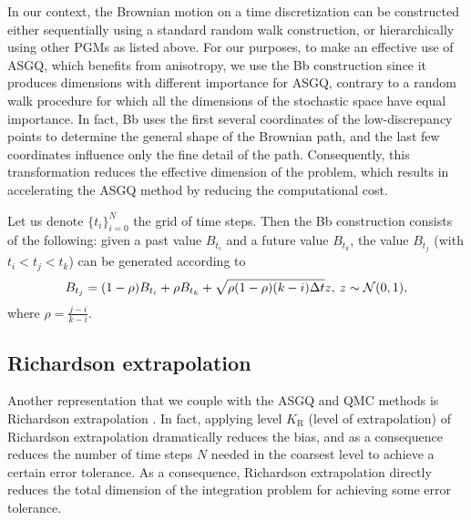 In our context, the Brownian motion on a time discretization  can be constructed either sequentially using a standard random walk construction, or hierarchically using   other PGMs as listed above. For our purposes, to make an effective use of ASGQ, which benefits from anisotropy, we use the Bb construction since it produces  dimensions with different importance for ASGQ, contrary to a random walk procedure for which all the dimensions of the stochastic space have equal importance. In fact, Bb uses the first several coordinates of the low-discrepancy points to determine the general shape of the Brownian path, and the last few coordinates influence only the fine detail of the path. Consequently, this transformation  reduces the effective dimension  of the problem, which results in accelerating the ASGQ method by reducing the computational cost.

Let us denote $\{t_i\}_{i=0}^{N}$ the grid of time steps. Then the Bb construction \cite{glasserman2004monte} consists of the following: given a past value $B_{t_i}$ and a future value $B_{t_k}$, the value $B_{t_j}$ (with $t_i < t_j < t_k$) can be generated according to 
\begin{equation*}
B_{t_j}=(1-\rho) B_{t_i}+\rho B_{t_k}+ \sqrt{\rho (1-\rho)(k-i) \Delta t} z, \: z \sim \mathcal{N}(0,1) ,
\end{equation*}
where $\rho=\frac{j-i}{k-i}$.  

\subsection{Richardson extrapolation}\label{sec:Richardson extrapolation}
Another representation that we couple with the ASGQ and QMC methods is Richardson extrapolation \cite{talay1990expansion}. In fact, applying level $K_\text{R}$ (level of extrapolation) of Richardson extrapolation  dramatically reduces the bias, and as a consequence reduces the  number of time steps $N$ needed in the coarsest level to achieve a certain error tolerance. As a consequence, Richardson extrapolation directly reduces  the total dimension of the integration problem for achieving some error tolerance.

